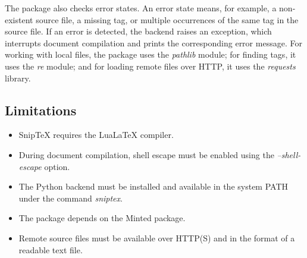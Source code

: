 \documentclass{article}
\begin{document}
The package also checks error states. An error state means, for example, a non-existent source file, 
a missing tag, or multiple occurrences of the same tag in the source file. If an error is detected, 
the backend raises an exception, which interrupts document compilation and prints the corresponding error message. 
For working with local files, the package uses the \textit{pathlib} module; for finding tags, it uses the \textit{re} module; 
and for loading remote files over HTTP, it uses the \textit{requests} library.

\subsection*{Limitations}

\begin{itemize}
    \item Snip\TeX{} requires the LuaLaTeX compiler.
    
    \item During document compilation, 
    shell escape must be enabled using the \textit{--shell-escape} option.

    \item The Python backend must be installed and available in the system PATH 
    under the command \textit{sniptex}.

    \item The package depends on the Minted package.

    \item Remote source files must be available over HTTP(S) and in the format of 
    a readable text file.
\end{itemize}



\end{document}
